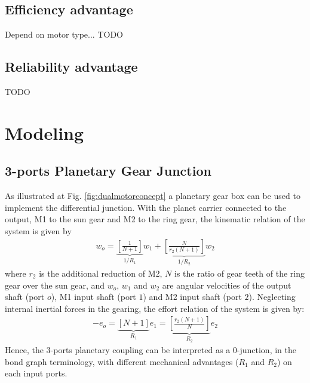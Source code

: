 \subsection{Efficiency advantage}
\label{sec:EffAdvantage}

Depend on motor type... TODO


\subsection{Reliability advantage}
\label{sec:RelAdvantage}

TODO



\section{Modeling}
\label{sec:mod}


\subsection{3-ports Planetary Gear Junction}
As illustrated at Fig. \ref{fig:dualmotorconcept} a planetary gear box can be used to implement the differential junction. With the planet carrier connected to the output, M1 to the sun gear and M2 to the ring gear, the kinematic relation of the system is given by
%
\begin{align}
	w_o = 
	\underbrace{ \left[ 
	\frac{ 1 }{N+1}
	\right] }_{  1/R_1  }
	w_1 + 
	\underbrace{ \left[ 
	\frac{ N  }{r_2 (N+1)}
	\right] }_{  1/R_2  }
	w_2
\label{eq:kinematic}
\end{align}
%
where $r_2$ is the additional reduction of M2, $N$ is the ratio of gear teeth of the ring gear over the sun gear, and $w_o$, $w_1$ and $w_2$ are angular velocities of the output shaft (port $o$), M1 input shaft (port $1$) and M2 input shaft (port $2$). Neglecting internal inertial forces in the gearing, the effort relation of the system is given by:
%
\begin{align}
	- e_o =
	\underbrace{ \left[ 
	N+1
	\right] }_{ R_1  }
	e_1 = 
	\underbrace{ \left[ 
	\frac{r_2(N+1)}{N}
	\right] }_{ R_2  }
	e_2
	\label{eq:torque}
\end{align}
%
Hence, the 3-ports planetary coupling can be interpreted as a 0-junction, in the bond graph terminology, with different mechanical advantages ($R_1$ and $R_2$) on each input ports. 

